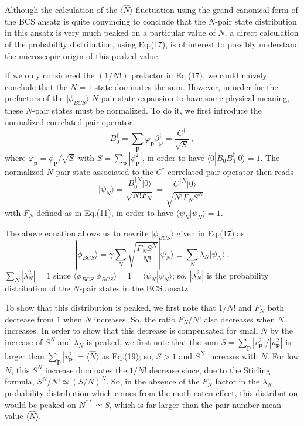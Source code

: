 \documentclass[twocolumn,showpacs]{revtex4}
\def\v#1{\mathbf{#1}}
\begin{document}
Although the calculation of the $\langle\hat{N}\rangle$ fluctuation using the grand canonical form of the BCS ansatz is quite convincing to conclude that the $N$-pair state distribution in this ansatz is very much peaked on a particular value of $N$, a direct calculation of the probability distribution, using Eq.(17), is of interest to possibly understand the microscopic origin of this peaked value.

If we only considered  the $(1/N!)$ prefactor in Eq.(17), we could na\"{\i}vely conclude that the $N=1$ state dominates the sum. However, in order for the prefactors of the  $|\phi_{BCS}\rangle$ $N$-pair state expansion to have some physical meaning, these $N$-pair states must be normalized. To do it, we first introduce the normalized correlated pair operator
\begin{equation}
B_0^\dag=\sum_{\v p}\varphi_{\v p}\beta_{\v p}^\dag=\frac{C^\dag}{\sqrt{S}}\ ,
\end{equation}
where $\varphi_{\v p}=\phi_{\v p}/\sqrt{S}$ with $S=\sum_{\v p}|\phi_{\v p}^2|$, in order to have $\langle 0|B_0B_0^\dag|0\rangle=1$. The normalized $N$-pair state associated to the $C^\dag$ correlated pair operator then reads
\begin{equation}
|\psi_N\rangle=\frac{B_0^{\dag N}|0\rangle}{\sqrt{N!F_N}}=\frac{C^{\dag N}|0\rangle}{\sqrt{N!F_NS^N}}\ 
\end{equation}
with $F_N$ defined as in Eq.(11), in order to have $\langle\psi_N|\psi_N\rangle=1$.

The above equation allows us to rewrite $|\phi_{BCS}\rangle$ given in Eq.(17) as
\begin{equation}
|\phi_{BCS}\rangle=\gamma\sum_{N}\sqrt{\frac{F_NS^N}{N!}}|\psi_N\rangle
\equiv\sum_{N}\lambda_N|\psi_N\rangle\ .
\end{equation}
$\sum_N |\lambda_N^2|=1$ since $\langle\phi_{BCS}|\phi_{BCS}\rangle=1=\langle\psi_N|\psi_N\rangle$; so, $|\lambda_N^2|$ is the probability distribution of the $N$-pair states in the BCS ansatz.

To show that this distribution is peaked, we first note that $1/N!$ and $F_N$ both decrease from $1$ when $N$ increases. So, the ratio $F_N/N!$ also decreases when $N$ increases. In order to show that this decrease is compensated for small $N$ by the increase of $S^N$ and $\lambda_N$ is peaked, we first note that the sum $S=\sum_{\v p}|v_{\v p}^2|/|u_{\v p}^2|$ is  larger than $\sum_{\v p}|v_{\v p}^2|=\langle\hat{N}\rangle$ as Eq.(19); so, $S> 1$ and $S^N$ increases with $N$. For low $N$, this $S^N$ increase dominates the $1/N!$ decrease  since, due to the Stirling formula, $S^N/N!\simeq(S/N)^N$. So, in the absence of the $F_N$ factor in the $\lambda_N$ probability distribution which comes from the moth-eaten effect, this distribution would be peaked on $N^{\ast\ast}\simeq S$, which is far larger than the pair number mean value $\langle\hat{N}\rangle$.
\end{document}
